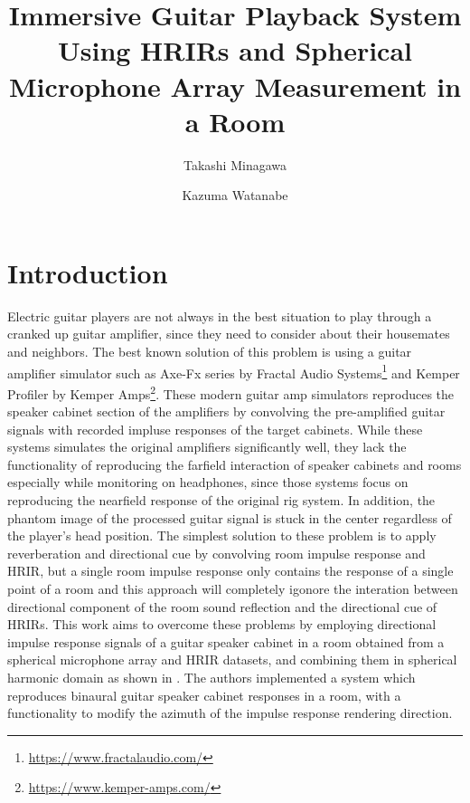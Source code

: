 \documentclass[convention,e-brief]{aesconf-current}
\title{ Immersive Guitar Playback System Using HRIRs and Spherical Microphone Array Measurement in a Room}
\author[1]{Takashi Minagawa}
\author[1]{Kazuma Watanabe}
\affil[1]{Graduate School of Design, Kyushu University}
\begin{document}

\section{Introduction}

Electric guitar players are not always in the best situation to play through a cranked up guitar amplifier, since they need to consider about their housemates and neighbors.
The best known solution of this problem is using a guitar amplifier simulator such as Axe-Fx series by Fractal Audio Systems\footnote{\url{https://www.fractalaudio.com/}} and Kemper Profiler by Kemper Amps\footnote{\url{https://www.kemper-amps.com/}}.
These modern guitar amp simulators reproduces the speaker cabinet section of the amplifiers by convolving the pre-amplified guitar signals with recorded impluse responses of the target cabinets.
While these systems simulates the original amplifiers significantly well, they lack the functionality of reproducing the farfield interaction of speaker cabinets and rooms especially while monitoring on headphones, since those systems focus on reproducing the nearfield response of the original rig system.
In addition, the phantom image of the processed guitar signal is stuck in the center regardless of the player's head position.
The simplest solution to these problem is to apply reverberation and directional cue by convolving room impulse response and HRIR, but a single room impulse response only contains the response of a single point of a room and this approach will completely igonore the interation between directional component of the room sound reflection and the directional cue of HRIRs.
This work aims to overcome these problems by employing directional impulse response signals of a guitar speaker cabinet in a room obtained from a spherical microphone array and HRIR datasets, and combining them in spherical harmonic domain as shown in \cite{Andersson2017-qg}.
The authors implemented a system which reproduces binaural guitar speaker cabinet responses in a room, with a functionality to modify the azimuth of the impulse response rendering direction.
\end{document}
